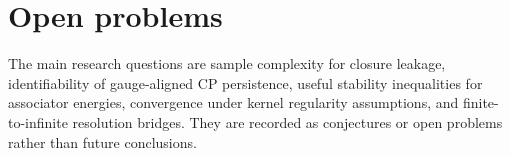 \section{Open problems}

The main research questions are sample complexity for closure leakage, identifiability of gauge-aligned CP persistence, useful stability inequalities for associator energies, convergence under kernel regularity assumptions, and finite-to-infinite resolution bridges. They are recorded as conjectures or open problems rather than future conclusions.

